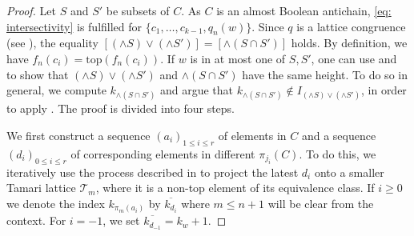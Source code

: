\documentclass[10pt,a4paper]{amsart}
\newcommand{\cT}{\mathcal{T}}
\begin{document}
\begin{proof}
    Let $S$ and $S'$ be subsets of $ C$. As $C$ is an almost Boolean antichain, \eqref{eq: intersectivity} is fulfilled for $\{c_1, \dots, c_{k-1}, q_n(w)\}$. Since $q$ is a lattice congruence (see ), the equality $[(\wedge S) \vee (\wedge S')] = [\wedge (S\cap S')]$ holds. By definition, we have $f_n(c_i) = \text{top}(f_n(c_i))$. If $w$ is in at most one of $S, S'$, one can use  and  to show that $(\wedge S) \vee (\wedge S')$ and $\wedge (S\cap S')$ have the same height. To do so in general, we compute $k_{\wedge (S\cap S')}$ and argue that $k_{\wedge (S\cap S')}\not\in I_{(\wedge S) \vee (\wedge S')}$, in order to apply . The proof is divided into four steps.

    We first construct a sequence $(a_i)_{1\leq i\leq r}$ of elements in $C$ and a sequence $(d_i)_{0\leq i\leq r}$ of corresponding elements in different $\pi_{j_i}(C)$. To do this, we iteratively use the process described in  to project the latest $d_i$ onto a smaller Tamari lattice $\cT_m$, where it is a non-top element of its equivalence class. 
    If $i\geq 0$ we denote the index $k_{\pi_m(a_i)}$ by $\overline{k_{d_i}}$ where $m\leq n +1$ will be clear from the context. For $i = -1$, we set $\overline{k_{d_{-1}}} = k_{w}+1$.
    

\end{proof}
\end{document}
